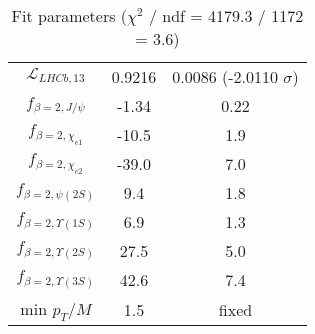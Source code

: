 \begin{table}[h!]
\begin{tabular}{c|c|c}
$\mathcal L_{LHCb,13}$ & 0.9216 & 0.0086 (-2.0110 $\sigma$) \\
$f_{\beta=2,J/\psi}$ & -1.34 & 0.22 \\
$f_{\beta=2,\chi_{c1}}$ & -10.5 & 1.9 \\
$f_{\beta=2,\chi_{c2}}$ & -39.0 & 7.0 \\
$f_{\beta=2,\psi(2S)}$ & 9.4 & 1.8 \\
$f_{\beta=2,\Upsilon(1S)}$ & 6.9 & 1.3 \\
$f_{\beta=2,\Upsilon(2S)}$ & 27.5 & 5.0 \\
$f_{\beta=2,\Upsilon(3S)}$ & 42.6 & 7.4 \\
min $p_T/M$ & 1.5 & fixed \\
\end{tabular}
\caption{Fit parameters ($\chi^2$ / ndf = 4179.3 / 1172 = 3.6)}
\end{table}
